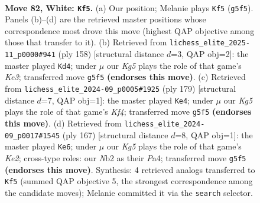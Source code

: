 \documentclass[11pt]{article}
\begin{document}
\clearpage

\begin{figure}[p]\centering
\begin{subfigure}{0.46\textwidth}\centering
\resizebox{\linewidth}{!}{%
\newchessgame
\chessboard[
  setfen={8/k7/8/6K1/3r4/1R6/1N4P1/8 w - - 28 82},
  showmover=false,
  pgfstyle=straightmove, color=movearrow, markmove={g5-f5}
]}
\caption{}
\end{subfigure}\hfill
\begin{subfigure}{0.46\textwidth}\centering
\resizebox{\linewidth}{!}{%
\newchessgame
\chessboard[
  setfen={8/8/8/5k2/8/R1N1K3/1r6/8 w - - 1 80},
  showmover=false,
  pgfstyle=straightmove, color=movearrow, markmove={e3-d4}
]}
\caption{}
\end{subfigure}
\\[4pt]
\begin{subfigure}{0.46\textwidth}\centering
\resizebox{\linewidth}{!}{%
\newchessgame
\chessboard[
  setfen={8/8/8/4nk2/8/6R1/r7/3K4 b - - 67 90},
  showmover=false,
  pgfstyle=straightmove, color=movearrow, markmove={f5-e4}
]}
\caption{}
\end{subfigure}\hfill
\begin{subfigure}{0.46\textwidth}\centering
\resizebox{\linewidth}{!}{%
\newchessgame
\chessboard[
  setfen={8/4k3/8/8/p1r5/3R4/8/1K6 b - - 3 84},
  showmover=false,
  pgfstyle=straightmove, color=movearrow, markmove={e7-e6}
]}
\caption{}
\end{subfigure}
\caption{\textbf{Move 82, White: \texttt{Kf5}.} (a) Our position; Melanie plays \texttt{Kf5} (\texttt{g5f5}). Panels (b)--(d) are the retrieved master positions whose correspondence most drove this move (highest QAP objective among those that transfer to it). (b) Retrieved from \texttt{lichess\_elite\_2025-11\_p0000\#941} (ply 158) [structural distance $d$=3, QAP obj=2]: the master played \texttt{Kd4}; under $\mu$ our \emph{Kg5} plays the role of that game's \emph{Ke3}; transferred move \texttt{g5f5} \textbf{(endorses this move)}. (c) Retrieved from \texttt{lichess\_elite\_2024-09\_p0005\#1925} (ply 179) [structural distance $d$=7, QAP obj=1]: the master played \texttt{Ke4}; under $\mu$ our \emph{Kg5} plays the role of that game's \emph{Kf4}; transferred move \texttt{g5f5} \textbf{(endorses this move)}. (d) Retrieved from \texttt{lichess\_elite\_2024-09\_p0017\#1545} (ply 167) [structural distance $d$=8, QAP obj=1]: the master played \texttt{Ke6}; under $\mu$ our \emph{Kg5} plays the role of that game's \emph{Ke2}; cross-type roles: our \emph{N}b2 as their \emph{P}a4; transferred move \texttt{g5f5} \textbf{(endorses this move)}. Synthesis: 4 retrieved analogs transferred to \texttt{Kf5} (summed QAP objective 5, the strongest correspondence among the candidate moves); Melanie committed it via the \texttt{search} selector.}
\label{fig:thought-m162}
\end{figure}
\end{document}
